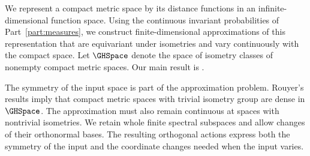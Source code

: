 We represent a compact metric space by its distance functions in
an infinite-dimensional function space.
Using the continuous invariant probabilities of Part~\ref{part:measures},
we construct finite-dimensional approximations of this representation
that are equivariant under isometries and vary continuously with the compact space.
Let
$\GHSpace$
denote the space of isometry classes of nonempty compact metric spaces.
Our main result is .

The symmetry of the input space is part of the approximation problem.
Rouyer's results
\cite[arXiv v1, Theorems~2 and~4]{Rouyer2011}
imply that compact metric spaces with trivial isometry group are dense in
$\GHSpace$.
The approximation must also remain continuous at spaces with nontrivial
isometries.
We retain whole finite spectral subspaces and allow changes of their
orthonormal bases.
The resulting orthogonal actions express both the symmetry of the input
and the coordinate changes needed when the input varies.


